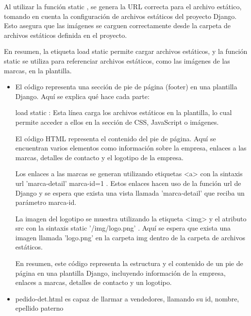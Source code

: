 \documentclass{article}
\begin{document}
\begin{itemize}
\begin{itemize}
\begin{itemize}
                Al utilizar la función { static }, se genera la URL correcta para el archivo estático, tomando en cuenta la configuración de archivos estáticos del proyecto Django. Esto asegura que las imágenes se carguen correctamente desde la carpeta de archivos estáticos definida en el proyecto.

                En resumen, la etiqueta { load static } permite cargar archivos estáticos, y la función { static } se utiliza para referenciar archivos estáticos, como las imágenes de las marcas, en la plantilla.
            \end{itemize}
            
            \begin{itemize}
                \item El código representa una sección de pie de página (footer) en una plantilla Django. Aquí se explica qué hace cada parte:

                { load static }: Esta línea carga los archivos estáticos en la plantilla, lo cual permite acceder a ellos en la sección de CSS, JavaScript o imágenes.

                El código HTML representa el contenido del pie de página. Aquí se encuentran varios elementos como información sobre la empresa, enlaces a las marcas, detalles de contacto y el logotipo de la empresa.

                Los enlaces a las marcas se generan utilizando etiquetas <a> con la sintaxis { url 'marca-detail' marca-id=1 }. Estos enlaces hacen uso de la función url de Django y se espera que exista una vista llamada 'marca-detail' que reciba un parámetro marca-id.

                La imagen del logotipo se muestra utilizando la etiqueta <img> y el atributo src con la sintaxis { static '/img/logo.png' }. Aquí se espera que exista una imagen llamada 'logo.png' en la carpeta img dentro de la carpeta de archivos estáticos.

                En resumen, este código representa la estructura y el contenido de un pie de página en una plantilla Django, incluyendo información de la empresa, enlaces a marcas, detalles de contacto y un logotipo.
            \end{itemize}
            

            \begin{itemize}
                \item pedido-det.html es capaz de llarmar a vendedores, llamando su id, nombre, epellido paterno
            \end{itemize}
            


\end{itemize}
\end{itemize}
\end{document}

